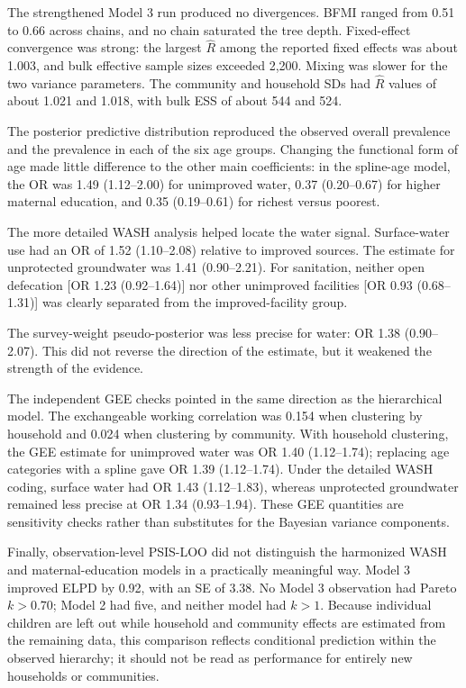 \documentclass[11pt]{article}
\begin{document}
The strengthened Model 3 run produced no divergences. BFMI ranged from 0.51 to 0.66 across chains, and no chain saturated the tree depth. Fixed-effect convergence was strong: the largest $\hat R$ among the reported fixed effects was about 1.003, and bulk effective sample sizes exceeded 2,200. Mixing was slower for the two variance parameters. The community and household SDs had $\hat R$ values of about 1.021 and 1.018, with bulk ESS of about 544 and 524.

The posterior predictive distribution reproduced the observed overall prevalence and the prevalence in each of the six age groups. Changing the functional form of age made little difference to the other main coefficients: in the spline-age model, the OR was 1.49 (1.12--2.00) for unimproved water, 0.37 (0.20--0.67) for higher maternal education, and 0.35 (0.19--0.61) for richest versus poorest.

The more detailed WASH analysis helped locate the water signal. Surface-water use had an OR of 1.52 (1.10--2.08) relative to improved sources. The estimate for unprotected groundwater was 1.41 (0.90--2.21). For sanitation, neither open defecation [OR 1.23 (0.92--1.64)] nor other unimproved facilities [OR 0.93 (0.68--1.31)] was clearly separated from the improved-facility group.

The survey-weight pseudo-posterior was less precise for water: OR 1.38 (0.90--2.07). This did not reverse the direction of the estimate, but it weakened the strength of the evidence.

The independent GEE checks pointed in the same direction as the hierarchical model. The exchangeable working correlation was 0.154 when clustering by household and 0.024 when clustering by community. With household clustering, the GEE estimate for unimproved water was OR 1.40 (1.12--1.74); replacing age categories with a spline gave OR 1.39 (1.12--1.74). Under the detailed WASH coding, surface water had OR 1.43 (1.12--1.83), whereas unprotected groundwater remained less precise at OR 1.34 (0.93--1.94). These GEE quantities are sensitivity checks rather than substitutes for the Bayesian variance components.

Finally, observation-level PSIS-LOO did not distinguish the harmonized WASH and maternal-education models in a practically meaningful way. Model 3 improved ELPD by 0.92, with an SE of 3.38. No Model 3 observation had Pareto $k>0.70$; Model 2 had five, and neither model had $k>1$. Because individual children are left out while household and community effects are estimated from the remaining data, this comparison reflects conditional prediction within the observed hierarchy; it should not be read as performance for entirely new households or communities.
\end{document}
